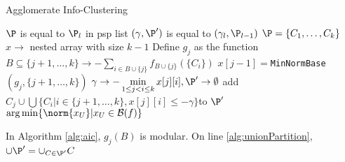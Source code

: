 \begin{algorithm}
\caption{Agglomerate Info-Clustering}\label{alg:aic}
	\begin{algorithmic}[1]
		\REQUIRE $\P$ is equal to $\P_l$ in psp list
		\ENSURE $(\gamma, \P')$ is equal to $(\gamma_l, \P_{l-1})$
		\STATE $\P = \{C_1, \dots, C_k\}$
		\STATE $x \to $ nested array with size $k-1$
			\STATE Define $g_j$ as the function $B \subseteq \{j+1, \dots, k\} \to 
			-\sum_{i\in B\cup\{j\}} f_{B\cup \{j\}} (\{C_i\})$
			\STATE $x[j-1] = $\texttt{MinNormBase}$(g_j, \{j+1, \dots, k\})$
		\ENDFOR
		\STATE $\gamma \to - \displaystyle\min_{1 \leq j<i\leq k} x[j][i], \P' \to \emptyset$
			 \label{alg:unionPartition}
			\STATE add $C_j \cup \bigcup\{C_i | i\in\{j+1, \dots, k\}, x[j][i]\leq -\gamma\}$to $\P'$
			\ENDIF
		\ENDFOR
		\RETURN $\arg\min \{\norm{x_U} | x_U \in \mathcal{B}(f)\}$
		\ENDFUNCTION
	\end{algorithmic}
\end{algorithm}
In Algorithm \ref{alg:aic}, $g_j(B)$ is modular. On line \ref{alg:unionPartition}, $\cup\P'=\cup_{C\in \P'} C$